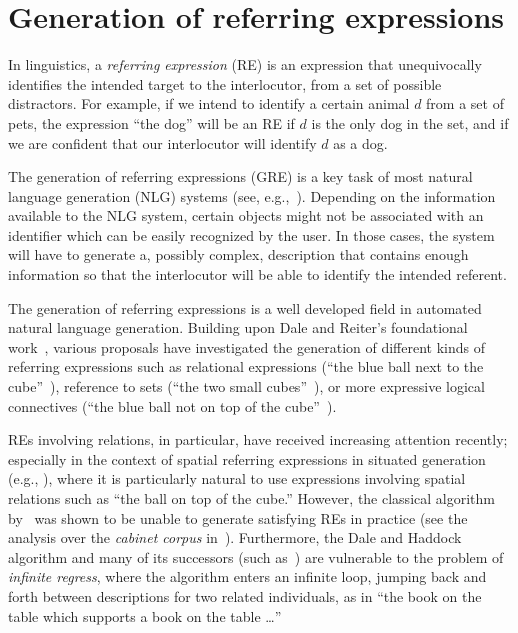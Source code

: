 \section{Generation of referring expressions}\label{sec:gre}

In linguistics, a \emph{referring expression} (RE) is an expression that 
unequivocally identifies the intended target to the interlocutor, from a set of possible distractors.  
For example, if we intend to identify a certain animal $d$ from a set of pets, the expression 
``the dog'' will be an RE if $d$ is the only dog in the set, and if we are confident
that our interlocutor will identify $d$ as a dog. 

The generation of referring expressions (GRE)  is a key task of most natural 
language generation (NLG) systems (see, e.g.,~\cite[Section 5.4]{dale2000}). 
Depending on the information available to the NLG system, certain objects might 
not be associated with an identifier which can be easily recognized by the user. 
In those cases, the system will have to generate a, possibly complex, description that contains 
enough information so that the interlocutor will be able to identify the intended referent.

The generation of referring expressions is a well developed field in automated natural language generation.
Building upon Dale and Reiter's foundational work~\cite{dale89cooking,Dale1995},
various proposals have investigated the generation of different kinds of referring expressions 
such as relational expressions (``the blue ball next to the cube''~\cite{dale91:_gener_refer_expres_invol_relat}),
reference to sets (``the two small cubes''~\cite{Stone2000}), or more expressive logical connectives (``the 
blue ball not on top of the cube''~\cite{deemter02:_gener_refer_expres}).

REs involving relations, in particular, have
received increasing attention recently; especially in the context of
spatial referring expressions in situated generation (e.g., \cite{kelleher06:_increm_gener_of_spatial_refer}), where it is
particularly natural to use expressions involving spatial relations such as ``the ball on top of the cube.''  However, the classical algorithm by~ was shown to be unable to generate satisfying REs in practice (see the 
analysis over the \emph{cabinet corpus} in~\cite{viethen06:_algor_for_gener_refer_expres}).  Furthermore, the Dale
and Haddock algorithm and many of its successors (such as~\cite{kelleher06:_increm_gener_of_spatial_refer}) are vulnerable to
the problem of \emph{infinite regress}, where the algorithm enters an infinite loop, jumping back
and forth between descriptions for two related individuals, as in ``the book on the table which supports a book on the
table \ldots''

